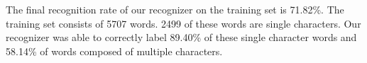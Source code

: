 The final recognition rate of our recognizer on the training set is 71.82\%. The training set consists of 5707 words. 2499 of these words are single characters. Our recognizer was able to correctly label 89.40\% of these single character words and 58.14\% of words composed of multiple characters. 
